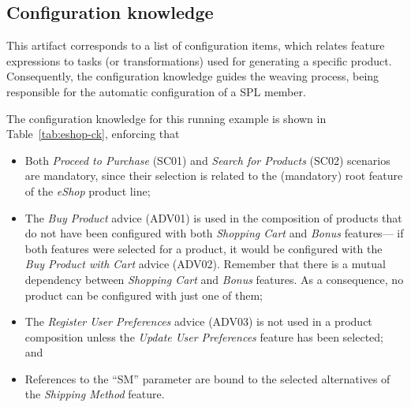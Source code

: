 \documentclass{acm_proc_article-sp}
\begin{document}
\subsection{Configuration knowledge}\label{sub:configuration-knowledge}

{\color{red} This artifact corresponds to a list of configuration items, which
relates feature expressions to tasks (or transformations) used for generating a
specific product. Consequently, the configuration knowledge guides the weaving
process, being responsible for the automatic configuration of a SPL member. }

The configuration knowledge for this running example is shown in
Table~\ref{tab:eshop-ck}, enforcing that

\begin{itemize}
\item Both \emph{Proceed to Purchase} (SC01) and \emph{Search for Products}
(SC02) scenarios are mandatory, since their selection is related to the
(mandatory) root feature of the \emph{eShop} product line;

\item The \emph{Buy Product} advice (ADV01) is used in the composition of
products that do not have been configured with both \emph{Shopping Cart} and \emph{Bonus}
features--- if both features were selected for a product, it would be configured
with the \emph{Buy Product with Cart} advice (ADV02). Remember that there is a
mutual dependency between \emph{Shopping Cart} and \emph{Bonus} features. As a
consequence, no product can be configured with just one of them;

\item The \emph{Register User Preferences} advice (ADV03) is not used in a
product composition unless the \emph{Update User Preferences} feature has been
selected; and

\item References to the ``SM'' parameter are bound to the
selected alternatives of the \emph{Shipping Method} feature.

\end{itemize}
\end{document}
